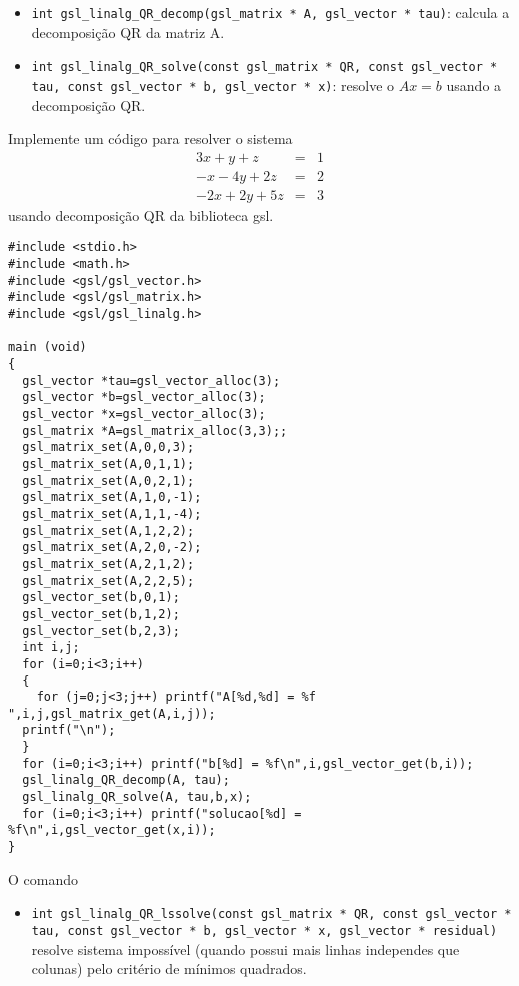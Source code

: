 \begin{itemize}
\item \verb|int gsl_linalg_QR_decomp(gsl_matrix * A, gsl_vector * tau)|: calcula a decomposição QR da matriz A.
 \item \verb|int gsl_linalg_QR_solve(const gsl_matrix * QR, const gsl_vector * tau, const gsl_vector * b, gsl_vector * x)|: resolve o  $A x = b$ usando a decomposição QR.
\end{itemize}
\begin{ex}Implemente um código para resolver o sistema
\begin{eqnarray*}
3x+y+z&=&1\\
-x-4y+2z&=&2\\
-2x+2y+5z&=&3
\end{eqnarray*}
usando decomposição QR da biblioteca gsl.
\end{ex}

\begin{verbatim}
#include <stdio.h>
#include <math.h>
#include <gsl/gsl_vector.h>
#include <gsl/gsl_matrix.h>
#include <gsl/gsl_linalg.h>

main (void)
{
  gsl_vector *tau=gsl_vector_alloc(3);
  gsl_vector *b=gsl_vector_alloc(3);
  gsl_vector *x=gsl_vector_alloc(3);
  gsl_matrix *A=gsl_matrix_alloc(3,3);;
  gsl_matrix_set(A,0,0,3);
  gsl_matrix_set(A,0,1,1);
  gsl_matrix_set(A,0,2,1);
  gsl_matrix_set(A,1,0,-1);
  gsl_matrix_set(A,1,1,-4);
  gsl_matrix_set(A,1,2,2);
  gsl_matrix_set(A,2,0,-2);
  gsl_matrix_set(A,2,1,2);
  gsl_matrix_set(A,2,2,5);
  gsl_vector_set(b,0,1);
  gsl_vector_set(b,1,2);
  gsl_vector_set(b,2,3);
  int i,j;
  for (i=0;i<3;i++)
  {
    for (j=0;j<3;j++) printf("A[%d,%d] = %f ",i,j,gsl_matrix_get(A,i,j));
  printf("\n");
  }
  for (i=0;i<3;i++) printf("b[%d] = %f\n",i,gsl_vector_get(b,i));
  gsl_linalg_QR_decomp(A, tau);
  gsl_linalg_QR_solve(A, tau,b,x);
  for (i=0;i<3;i++) printf("solucao[%d] = %f\n",i,gsl_vector_get(x,i));
}
\end{verbatim}

O comando
\begin{itemize}
 \item \verb|int gsl_linalg_QR_lssolve(const gsl_matrix * QR, const gsl_vector * tau, const gsl_vector * b, gsl_vector * x, gsl_vector * residual)| resolve sistema impossível (quando possui mais linhas independes que colunas) pelo critério de mínimos quadrados.
\end{itemize}

